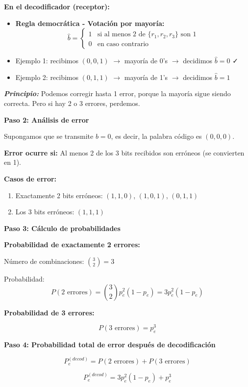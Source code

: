 \documentclass[11pt,a4paper]{article}
\begin{document}
\textbf{En el decodificador (receptor):}
\begin{itemize}
    \item \textbf{Regla democr\'atica - Votaci\'on por mayor\'ia:}
    \[
    \hat{b} = \begin{cases}
    1 & \text{si al menos 2 de } \{r_1, r_2, r_3\} \text{ son 1} \\
    0 & \text{en caso contrario}
    \end{cases}
    \]
    \item Ejemplo 1: recibimos $(0,0,1)$ $\to$ mayor\'ia de 0's $\to$ decidimos $\hat{b}=0$ ✓
    \item Ejemplo 2: recibimos $(0,1,1)$ $\to$ mayor\'ia de 1's $\to$ decidimos $\hat{b}=1$
\end{itemize}

\textit{\textbf{Principio:}} Podemos corregir hasta 1 error, porque la mayor\'ia sigue siendo correcta. Pero si hay 2 o 3 errores, perdemos.

\textbf{Paso 2: An\'alisis de error}

Supongamos que se transmite $b = 0$, es decir, la palabra c\'odigo es $(0, 0, 0)$.

\textbf{Error ocurre si:} Al menos 2 de los 3 bits recibidos son err\'oneos (se convierten en 1).

\textbf{Casos de error:}
\begin{enumerate}
    \item Exactamente 2 bits err\'oneos: $(1, 1, 0)$, $(1, 0, 1)$, $(0, 1, 1)$
    \item Los 3 bits err\'oneos: $(1, 1, 1)$
\end{enumerate}

\textbf{Paso 3: C\'alculo de probabilidades}

\textbf{Probabilidad de exactamente 2 errores:}

N\'umero de combinaciones: $\binom{3}{2} = 3$

Probabilidad:
\[
P(2 \text{ errores}) = \binom{3}{2} p_e^2 (1-p_e) = 3p_e^2(1-p_e)
\]

\textbf{Probabilidad de 3 errores:}

\[
P(3 \text{ errores}) = p_e^3
\]

\textbf{Paso 4: Probabilidad total de error despu\'es de decodificaci\'on}

\[
P_e^{(decod)} = P(2 \text{ errores}) + P(3 \text{ errores})
\]

\[
P_e^{(decod)} = 3p_e^2(1-p_e) + p_e^3
\]
\end{document}
